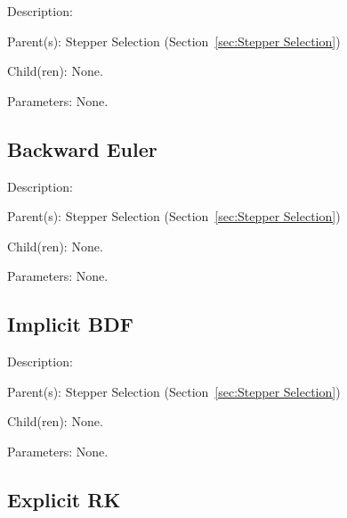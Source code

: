 \begin{list}{}
  {\setlength{\leftmargin}{1.0in}
   \setlength{\labelwidth}{0.75in}
   \setlength{\labelsep}{0.125in}}
  \item[Description:]
  \item[Parent(s):]
    Stepper Selection (Section~\ref{sec:Stepper Selection})
  \item[Child(ren):]
    None. 
  \item[Parameters:]
    None. 
\end{list}

\subsection{Backward Euler}
\label{sec:Backward Euler}

\begin{list}{}
  {\setlength{\leftmargin}{1.0in}
   \setlength{\labelwidth}{0.75in}
   \setlength{\labelsep}{0.125in}}
  \item[Description:]
  \item[Parent(s):]
    Stepper Selection (Section~\ref{sec:Stepper Selection})
  \item[Child(ren):]
    None. 
  \item[Parameters:]
    None. 
\end{list}

\subsection{Implicit BDF}
\label{sec:Implicit BDF}

\begin{list}{}
  {\setlength{\leftmargin}{1.0in}
   \setlength{\labelwidth}{0.75in}
   \setlength{\labelsep}{0.125in}}
  \item[Description:]
  \item[Parent(s):]
    Stepper Selection (Section~\ref{sec:Stepper Selection})
  \item[Child(ren):]
    None. 
  \item[Parameters:]
    None. 
\end{list}

\subsection{Explicit RK}
\label{sec:Explicit RK}

